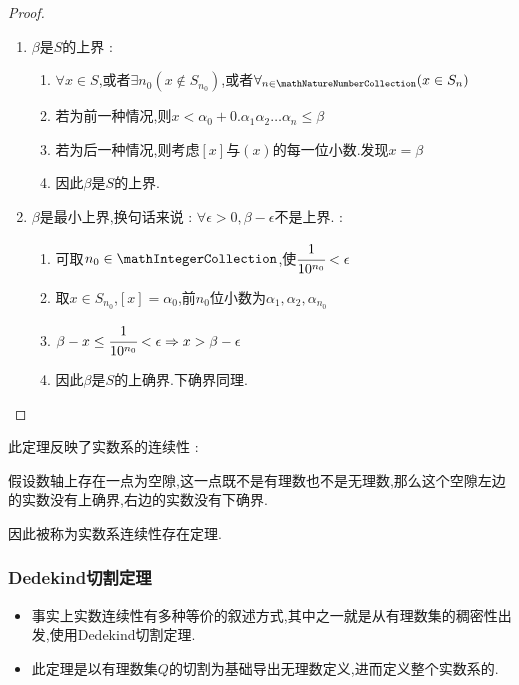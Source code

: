 {{{{\begin{enumerate}
{\begin{proof}
              \begin{enumerate}
                  \item $\beta$是$S$的上界 : \begin{enumerate}
                            \item $\forall x \in S$,或者$\exists n_0(x \notin S_{n_0})$,或者$\forall_{n \in \mathNatureNumberCollection}(x \in S_n)$
                            \item 若为前一种情况,则$x < \alpha_0 + 0.\alpha_1\alpha_2 \dots \alpha_n \leq \beta$
                            \item 若为后一种情况,则考虑$[x]$与$(x)$的每一位小数.发现$x = \beta$
                            \item 因此$\beta$是$S$的上界.
                        \end{enumerate}
                  \item $\beta$是最小上界,换句话来说 : $\forall \epsilon > 0,\beta - \epsilon$不是上界. : \begin{enumerate}
                            \item 可取$n_0 \in \mathIntegerCollection$,使$\cfrac{1}{10^{n_0}} < \epsilon$
                            \item 取$x \in S_{n_0}$,$[x] = \alpha_0$,前$n_0$位小数为$\alpha_1,\alpha_2,\alpha_{n_0}$
                            \item $\beta - x \leq \cfrac{1}{10^{n_0}} < \epsilon \Rightarrow x > \beta - \epsilon$
                            \item 因此$\beta$是$S$的上确界.下确界同理.
                        \end{enumerate}
              \end{enumerate}
          \end{proof}
          }
\end{enumerate}

此定理反映了实数系的连续性 :

假设数轴上存在一点为空隙,这一点既不是有理数也不是无理数,那么这个空隙左边的实数没有上确界,右边的实数没有下确界.

因此被称为实数系连续性存在定理.
}%

\subsubsection{Dedekind切割定理}{
    \begin{itemize}
        \item 事实上实数连续性有多种等价的叙述方式,其中之一就是从有理数集的稠密性出发,使用Dedekind切割定理.
        \item 此定理是以有理数集$Q$的切割为基础导出无理数定义,进而定义整个实数系的.
    \end{itemize}

}}}}
